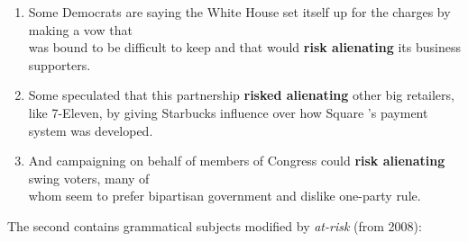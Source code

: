 \begin{enumerate}    [before=\color{black}\ttfamily] \setlength\itemsep{0em} \small
\item Some Democrats are saying the White House set itself up for the charges by making a vow that \\ was bound to be difficult to keep and that would \textbf{risk alienating} its business supporters.
\item Some speculated that this partnership \textbf{risked alienating} other big retailers, like 7-Eleven, by giving Starbucks influence over how Square 's payment system was developed.
\item And campaigning on behalf of members of Congress could \textbf{risk alienating} swing voters, many of \\ whom seem to prefer bipartisan government and dislike one-party rule.


\end{enumerate}
%
The second contains grammatical subjects modified by \emph{at-risk} (from 2008):

